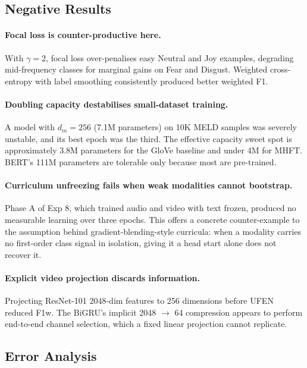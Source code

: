 \documentclass[11pt,twocolumn]{article}
\begin{document}
\subsection{Negative Results}

\paragraph{Focal loss is counter-productive here.} With $\gamma = 2$, focal loss over-penalises easy Neutral and Joy examples, degrading mid-frequency classes for marginal gains on Fear and Disgust. Weighted cross-entropy with label smoothing consistently produced better weighted F1.

\paragraph{Doubling capacity destabilises small-dataset training.} A model with $d_m = 256$ (7.1M parameters) on 10K MELD samples was severely unstable, and its best epoch was the third. The effective capacity sweet spot is approximately 3.8M parameters for the GloVe baseline and under 4M for MHFT. BERT's 111M parameters are tolerable only because most are pre-trained.

\paragraph{Curriculum unfreezing fails when weak modalities cannot bootstrap.} Phase A of Exp 8, which trained audio and video with text frozen, produced no measurable learning over three epochs. This offers a concrete counter-example to the assumption behind gradient-blending-style curricula: when a modality carries no first-order class signal in isolation, giving it a head start alone does not recover it.

\paragraph{Explicit video projection discards information.} Projecting ResNet-101 2048-dim features to 256 dimensions before UFEN reduced F1w. The BiGRU's implicit 2048 $\to$ 64 compression appears to perform end-to-end channel selection, which a fixed linear projection cannot replicate.

\subsection{Error Analysis}
\end{document}
